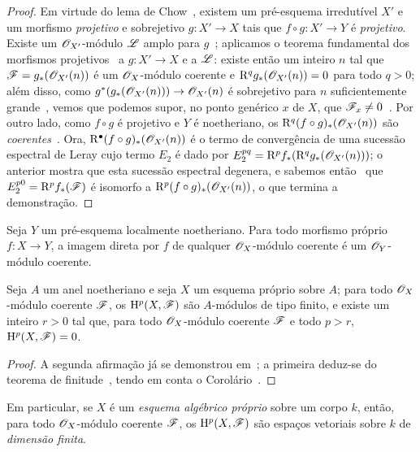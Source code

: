 \begin{proof}
Em virtude do lema de Chow~, existem um pré-esquema irredutível $X'$ e um morfismo \emph{projetivo} e sobrejetivo $g:X'\to X$ tais que $f\circ g:X'\to Y$ é \emph{projetivo}.
Existe um $\mathscr{O}_{X'}$-módulo $\mathscr{L}$ amplo para $g$~; aplicamos o teorema fundamental dos morfismos projetivos~ a $g:X'\to X$ e a $\mathscr{L}$: existe então um inteiro $n$ tal que $\mathscr{F}=g_*(\mathscr{O}_{X'}(n))$ é um $\mathscr{O}_X$-módulo coerente e $\mathrm{R}^q g_*(\mathscr{O}_{X'}(n))=0$ para todo $q>0$; além disso, como $g^*(g_*(\sh{O}_{X'}(n)))\to\sh{O}_{X'}(n)$ é sobrejetivo para $n$ suficientemente grande~, vemos que podemos supor, no ponto genérico $x$ de $X$, que $\mathscr{F}_x\neq 0$~.
Por outro lado, como $f\circ g$ é projetivo e $Y$ é noetheriano, os $\mathrm{R}^q(f\circ g)_*(\mathscr{O}_{X'}(n))$ são \emph{coerentes}~.
Ora, $\mathrm{R}^\bullet(f\circ g)_*(\mathscr{O}_{X'}(n))$ é o termo de convergência de uma sucessão espectral de Leray cujo termo $E_2$ é dado por $E_2^{pq}=\mathrm{R}^p f_*(\mathrm{R}^q g_*(\mathscr{O}_{X'}(n)))$; o anterior mostra que esta sucessão espectral degenera, e sabemos então~ que $E_2^{p0}=\mathrm{R}^p f_*(\mathscr{F})$ é isomorfo a $\mathrm{R}^p(f\circ g)_*(\mathscr{O}_{X'}(n))$, o que termina a demonstração.
\end{proof}

\begin{corollary}[3.2.2]
\label{III.3.2.2}
Seja $Y$ um pré-esquema localmente noetheriano.
Para todo morfismo próprio $f:X\to Y$, a imagem direta por $f$ de qualquer $\mathscr{O}_X$-módulo coerente é um $\mathscr{O}_Y$-módulo coerente.
\end{corollary}

\begin{corollary}[3.2.3]
\label{III.3.2.3}
Seja $A$ um anel noetheriano e seja $X$ um esquema próprio sobre $A$; para todo $\mathscr{O}_X$-módulo coerente $\mathscr{F}$, os $\mathrm{H}^p(X,\mathscr{F})$ são $A$-módulos de tipo finito, e existe um inteiro $r>0$ tal que, para todo $\mathscr{O}_X$-módulo coerente $\mathscr{F}$ e todo $p>r$, $\mathrm{H}^p(X,\mathscr{F})=0$.
\end{corollary}

\begin{proof}
A segunda afirmação já se demonstrou em~; a primeira deduz-se do teorema de finitude~, tendo em conta o Corolário~.
\end{proof}

Em particular, se $X$ é um \emph{esquema algébrico próprio} sobre um corpo $k$, então, para todo $\mathscr{O}_X$-módulo coerente $\mathscr{F}$, os $\mathrm{H}^p(X,\mathscr{F})$ são espaços vetoriais sobre $k$ de \emph{dimensão finita}.

